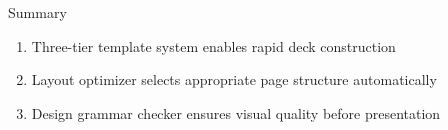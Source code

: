 \documentclass[aspectratio=169,10pt]{beamer}
\begin{document}
\begin{frame}{Summary}
  \begin{TLtext}
    \begin{enumerate}
      \item Three-tier template system enables rapid deck construction
      \item Layout optimizer selects appropriate page structure automatically
      \item Design grammar checker ensures visual quality before presentation
    \end{enumerate}
  \end{TLtext}

  \vspace{0.5em}
\end{frame}
\end{document}
